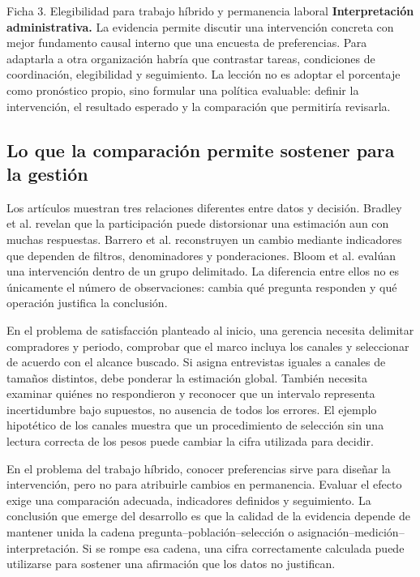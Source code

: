 {\begin{fichainvestigacion}{Ficha 3. Elegibilidad para trabajo híbrido y permanencia laboral}
\textbf{Interpretación administrativa.} La evidencia permite discutir una intervención concreta con mejor fundamento causal interno que una encuesta de preferencias. Para adaptarla a otra organización habría que contrastar tareas, condiciones de coordinación, elegibilidad y seguimiento. La lección no es adoptar el porcentaje como pronóstico propio, sino formular una política evaluable: definir la intervención, el resultado esperado y la comparación que permitiría revisarla.
\end{fichainvestigacion}

\subsection{Lo que la comparación permite sostener para la gestión}
Los artículos muestran tres relaciones diferentes entre datos y decisión. Bradley et al. revelan que la participación puede distorsionar una estimación aun con muchas respuestas. Barrero et al. reconstruyen un cambio mediante indicadores que dependen de filtros, denominadores y ponderaciones. Bloom et al. evalúan una intervención dentro de un grupo delimitado. La diferencia entre ellos no es únicamente el número de observaciones: cambia qué pregunta responden y qué operación justifica la conclusión.

En el problema de satisfacción planteado al inicio, una gerencia necesita delimitar compradores y periodo, comprobar que el marco incluya los canales y seleccionar de acuerdo con el alcance buscado. Si asigna entrevistas iguales a canales de tamaños distintos, debe ponderar la estimación global. También necesita examinar quiénes no respondieron y reconocer que un intervalo representa incertidumbre bajo supuestos, no ausencia de todos los errores. El ejemplo hipotético de los canales muestra que un procedimiento de selección sin una lectura correcta de los pesos puede cambiar la cifra utilizada para decidir.

En el problema del trabajo híbrido, conocer preferencias sirve para diseñar la intervención, pero no para atribuirle cambios en permanencia. Evaluar el efecto exige una comparación adecuada, indicadores definidos y seguimiento. La conclusión que emerge del desarrollo es que la calidad de la evidencia depende de mantener unida la cadena pregunta--población--selección o asignación--medición--interpretación. Si se rompe esa cadena, una cifra correctamente calculada puede utilizarse para sostener una afirmación que los datos no justifican.

\clearpage
}
